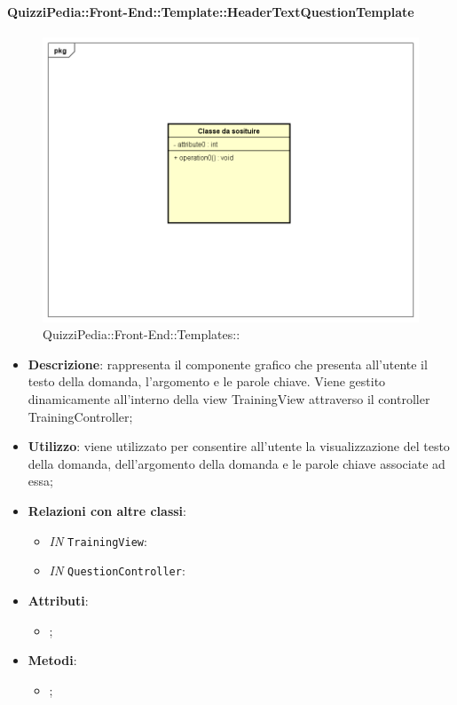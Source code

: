 		\paragraph{QuizziPedia::Front-End::Template::HeaderTextQuestionTemplate}
		
				\label{QuizziPedia::Front-End::Templates::HeaderTextQuestionTemplate}

				\begin{figure}[h]
					\centering
					\includegraphics[scale=0.5,keepaspectratio]{UML/Classi/Front-End/Temporanea.png}
					\caption{QuizziPedia::Front-End::Templates::}
				\end{figure}
		
			\begin{itemize}
				\item \textbf{Descrizione}: rappresenta il componente grafico che presenta all'utente il testo della domanda, l'argomento e le parole chiave. Viene gestito dinamicamente all'interno della view TrainingView attraverso il controller TrainingController;
				\item \textbf{Utilizzo}: viene utilizzato per consentire all'utente la visualizzazione del testo della domanda, dell'argomento della domanda e le parole chiave associate ad essa;
				\item \textbf{Relazioni con altre classi}: 
				\begin{itemize}
						\item \textit{IN} \texttt{TrainingView}: 
						\item \textit{IN} \texttt{QuestionController}:
				\end{itemize}
				\item \textbf{Attributi}: 
				\begin{itemize}
					\item ;
				\end{itemize}
				\item \textbf{Metodi}: 
				\begin{itemize}
					\item ;
				\end{itemize}
			\end{itemize}

